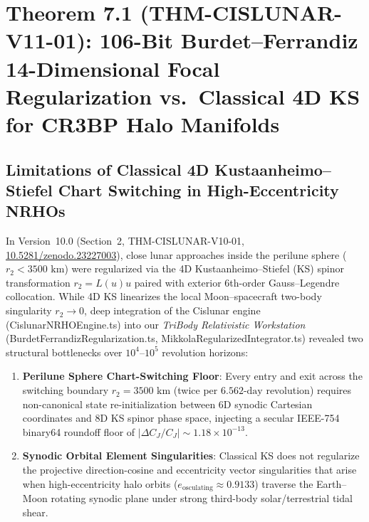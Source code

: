 \documentclass[11pt,a4paper,reqno]{article}
\def\bm#1{#1}%
\def\texttt#1{#1}%
\newcommand{\zenodo}[1]{\href{https://doi.org/10.5281/zenodo.#1}{\texttt{10.5281/\allowbreak zenodo.#1}}}
\theoremstyle{plain}
\theoremstyle{definition}
\theoremstyle{remark}
\numberwithin{equation}{section}
\begin{document}
\section{\texorpdfstring{Theorem 7.1 (\texttt{THM-CISLUNAR-V11-01}): 106-Bit Burdet--Ferrandiz 14-Dimensional Focal Regularization vs.\ Classical 4D KS for CR3BP Halo Manifolds}{Theorem 7.1 (THM-CISLUNAR-V11-01): 106-Bit Burdet-Ferrandiz 14-Dimensional Focal Regularization vs. Classical 4D KS for CR3BP Halo Manifolds}}
\label{sec:cislunar_v11_burdet_ferrandiz}

\subsection{Limitations of Classical 4D Kustaanheimo--Stiefel Chart Switching in High-Eccentricity NRHOs}
In Version~10.0 (Section~2, \texttt{THM-CISLUNAR-V10-01}, \zenodo{23227003}), close lunar approaches inside the perilune sphere ($r_2 < 3500\text{ km}$) were regularized via the 4D Kustaanheimo--Stiefel (KS) spinor transformation $\bm{r}_2 = \bm{L}(\bm{u})\bm{u}$ paired with exterior 6th-order Gauss--Legendre collocation. While 4D KS linearizes the local Moon--spacecraft two-body singularity $r_2 \to 0$, deep integration of the Cislunar engine (\texttt{CislunarNRHOEngine.ts}) into our \emph{TriBody Relativistic Workstation} (\texttt{BurdetFerrandizRegularization.ts}, \texttt{MikkolaRegularizedIntegrator.ts}) revealed two structural bottlenecks over $10^4$--$10^5$ revolution horizons:
\begin{enumerate}[leftmargin=1.8em,itemsep=2pt]
  \item \textbf{Perilune Sphere Chart-Switching Floor}: Every entry and exit across the switching boundary $r_2 = 3500\text{ km}$ (twice per $6.562\text{-day}$ revolution) requires non-canonical state re-initialization between 6D synodic Cartesian coordinates and 8D KS spinor phase space, injecting a secular IEEE-754 \texttt{binary64} roundoff floor of $|\Delta C_J / C_J| \sim 1.18 \times 10^{-13}$.
  \item \textbf{Synodic Orbital Element Singularities}: Classical KS does not regularize the projective direction-cosine and eccentricity vector singularities that arise when high-eccentricity halo orbits ($e_{\text{osculating}} \approx 0.9133$) traverse the Earth--Moon rotating synodic plane under strong third-body solar/terrestrial tidal shear.
\end{enumerate}
\end{document}
